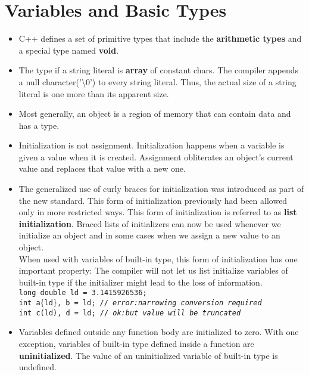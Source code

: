 \section{Variables and Basic Types}
\begin{itemize}

\item C++ defines a set of primitive types that include the \textbf{arithmetic types} and a special type named \textbf{void}.

\item The type if a string literal is \textbf{array} of constant chars. The compiler appends a null character('\textbackslash{}0') to every string literal. Thus, the actual size of a string literal is one more than its apparent size.

\item Most generally, an object is a region of memory that can contain data and has a type.

\item Initialization is not assignment. Initialization happens when a variable is given a value when it is created. Assignment obliterates an object's current value and replaces that value with a new one.

\item The generalized use of curly braces for initialization was introduced as part of the new standard. This form of initialization previously had been allowed only in more restricted ways. This form of initialization is referred to as \textbf{list initialization}. Braced lists of initializers can now be used whenever we initialize an object and in some cases when we assign a new value to an object.\\When used with variables of built-in type, this form of initialization has one important property: The compiler will not let us list initialize variables of built-in type if the initializer might lead to the loss of information.\\\hspace*{1em}\texttt{long double ld = 3.1415926536;}\\\hspace*{1em}\texttt{int a$\{$ld$\}$, b = {ld}; // \textit{error:narrowing conversion required}}\\\hspace*{1em}\texttt{int c(ld), d = ld; // \textit{ok:but value will be truncated}}

\item Variables defined outside any function body are initialized to zero. With one exception, variables of built-in type defined inside a function are \textbf{uninitialized}. The value of an uninitialized variable of built-in type is undefined.


\end{itemize}
